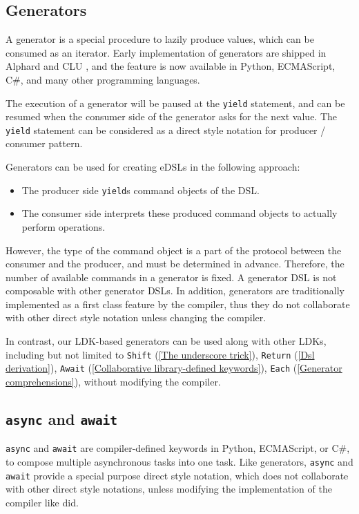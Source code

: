 \subsection{Generators}

A generator is a special procedure to lazily produce values, which can be consumed as an iterator. Early implementation of generators are shipped in Alphard \cite{shaw1977abstraction} and CLU \cite{liskov1977abstraction}, and the feature is now available in Python, ECMAScript, C\#, and many other programming languages.

The execution of a generator will be paused at the \lstinline{yield} statement, and can be resumed when the consumer side of the generator asks for the next value. The \lstinline{yield} statement can be considered as a direct style notation for producer / consumer pattern.

Generators can be used for creating eDSLs in the following approach:

\begin{itemize}
  \item The producer side \lstinline{yield}s command objects of the DSL.
  \item The consumer side interprets these produced command objects to actually perform operations.
\end{itemize}

However, the type of the command object is a part of the protocol between the consumer and the producer, and must be determined in advance. Therefore, the number of available commands in a generator is fixed. A generator DSL is not composable with other generator DSLs. In addition, generators are traditionally implemented as a first class feature by the compiler, thus they do not collaborate with other direct style notation unless changing the compiler.

In contrast, our LDK-based generators can be used along with other LDKs, including but not limited to \lstinline{Shift} (\cref{The underscore trick}), \lstinline{Return} (\cref{Dsl derivation}), \lstinline{Await} (\cref{Collaborative library-defined keywords}), \lstinline{Each} (\cref{Generator comprehensions}), without modifying the compiler.

\subsection{\lstinline{async} and \lstinline{await}}

\lstinline{async} and \lstinline{await} are compiler-defined keywords in Python, ECMAScript, or C\#, to compose multiple asynchronous tasks into one task. Like generators, \lstinline{async} and \lstinline{await} provide a special purpose direct style notation, which does not collaborate with other direct style notations, unless modifying the implementation of the compiler like \cite{pep525} did.

